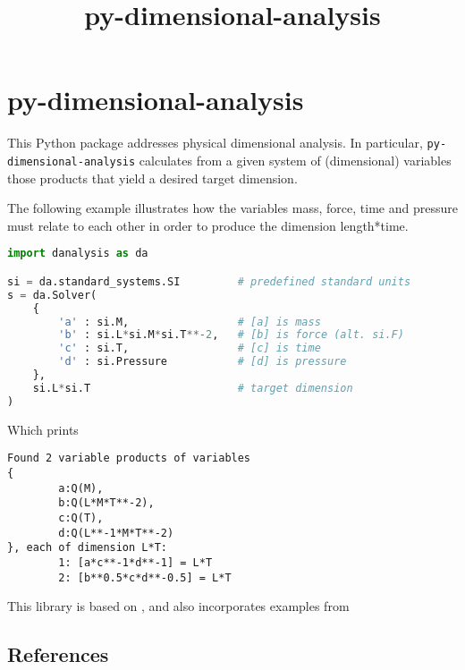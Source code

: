 \documentclass[11pt]{article}
\title{py-dimensional-analysis}
\date{}
\begin{document}
\maketitle

\section{py-dimensional-analysis}
This Python package addresses physical dimensional analysis. In particular, \texttt{py-dimensional-analysis} calculates from a given system of (dimensional) variables those products that yield a desired target dimension.


The following example illustrates how the variables mass, force, time and pressure must relate to each other in order to produce the dimension length*time.

\begin{lstlisting}[language=Python]
import danalysis as da

si = da.standard_systems.SI         # predefined standard units
s = da.Solver(
    {
        'a' : si.M,                 # [a] is mass
        'b' : si.L*si.M*si.T**-2,   # [b] is force (alt. si.F)
        'c' : si.T,                 # [c] is time
        'd' : si.Pressure           # [d] is pressure
    },
    si.L*si.T                       # target dimension
)
\end{lstlisting}
Which prints
\begin{lstlisting}
Found 2 variable products of variables
{
        a:Q(M),
        b:Q(L*M*T**-2),
        c:Q(T),
        d:Q(L**-1*M*T**-2)
}, each of dimension L*T:
        1: [a*c**-1*d**-1] = L*T
        2: [b**0.5*c*d**-0.5] = L*T
\end{lstlisting}

This library is based on \cite{szirtes2007applied}, and also incorporates examples from \cite{santiago2019first, sonin2001dimensional, lemons2017student,schetz1999fundamentals}

\subsection{References}

\begingroup
\renewcommand{\section}[2]{}%

\endgroup
\end{document}
